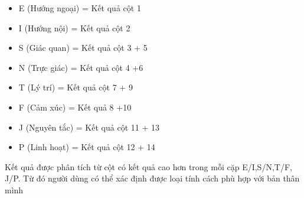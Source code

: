 \begin{itemize}
    \setlength\itemsep{0em}
    \item E (Hướng ngoại) = Kết quả cột 1
    \item I (Hướng nội) = Kết quả cột 2
    \item S (Giác quan)  = Kết quả cột 3 + 5
    \item N (Trực giác) = Kết quả cột 4 +6
    \item T (Lý trí) = Kết quả cột 7 + 9
    \item F (Cảm xúc) = Kết quả 8 +10
    \item J (Nguyên tắc)  = Kết quả cột 11 + 13
    \item P (Linh hoạt) = Kết quả cột 12 + 14
\end{itemize}

Kết quả được phân tích từ cột có kết quả cao hơn trong mỗi cặp E/I,S/N,T/F, J/P. Từ đó người dùng có thể xác định được loại tính cách phù hợp với bản thân mình